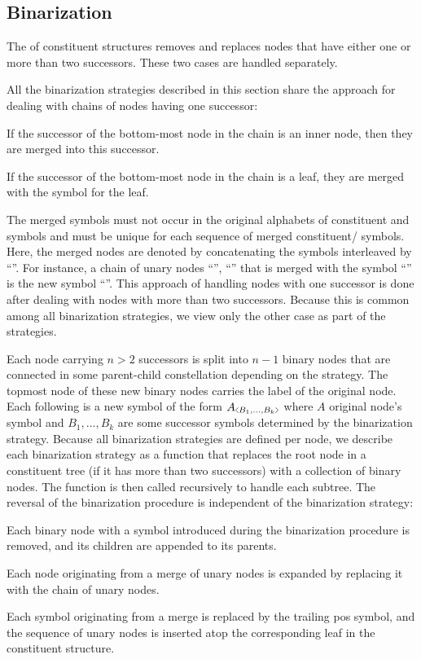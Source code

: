 \documentclass[../../document.tex]{subfiles}
\begin{document}
    \subsection{Binarization}\label{sec:binarization}
    The  of constituent structures removes and replaces nodes that have either one or more than two successors.
    These two cases are handled separately.

    All the binarization strategies described in this section share the approach for dealing with chains of nodes having one successor:
    \begin{inparaenum}
        \item If the successor of the bottom-most node in the chain is an inner node, then they are merged into this successor.
        \item If the successor of the bottom-most node in the chain is a leaf, they are merged with the  symbol for the leaf.
    \end{inparaenum}
    The merged symbols must not occur in the original alphabets of constituent and  symbols and must be unique for each sequence of merged constituent/ symbols.
    Here, the merged nodes are denoted by concatenating the symbols interleaved by ``\cn{+}''.
    For instance, a chain of unary nodes ``'', ``'' that is merged with the  symbol ``'' is the new symbol ``''.
    This approach of handling nodes with one successor is done after dealing with nodes with more than two successors.
    Because this is common among all binarization strategies, we view only the other case as part of the strategies.

    Each node carrying \( n > 2 \) successors is split into \( n-1 \) binary nodes that are connected in some parent-child constellation depending on the strategy.
    The topmost node of these new binary nodes carries the label of the original node.
    Each following is a new symbol of the form \(A\binsym{B_1, \ldots, B_k}\) where \(A\) original node's symbol and \(B_1, \ldots, B_k\) are some successor symbols determined by the binarization strategy.
    Because all binarization strategies are defined per node, we describe each binarization strategy as a function that replaces the root node in a constituent tree (if it has more than two successors) with a collection of binary nodes.
    The function is then called recursively to handle each subtree.
    The reversal of the binarization procedure is independent of the binarization strategy:
    \begin{compactenum}
        \item Each binary node with a symbol introduced during the binarization procedure is removed, and its children are appended to its parents.
        \item Each node originating from a merge of unary nodes is expanded by replacing it with the chain of unary nodes.
        \item Each  symbol originating from a merge is replaced by the trailing pos symbol, and the sequence of unary nodes is inserted atop the corresponding leaf in the constituent structure.
    \end{compactenum}
\end{document}
